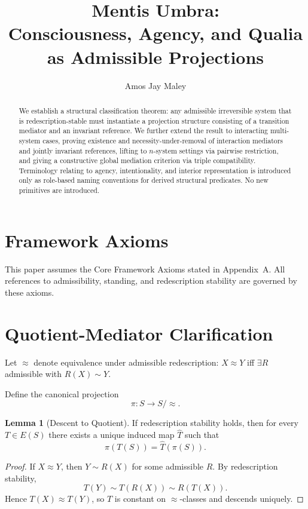 \documentclass[11pt]{article}
\title{Mentis Umbra:\\
Consciousness, Agency, and Qualia as Admissible Projections}
\author{Amos Jay Maley}
\date{}
\theoremstyle{definition}
\newtheorem{lemma}{Lemma}
\begin{document}
\maketitle

\begin{abstract}
We establish a structural classification theorem: any admissible irreversible system that is redescription-stable must instantiate a projection structure consisting of a transition mediator and an invariant reference. We further extend the result to interacting multi-system cases, proving existence and necessity-under-removal of interaction mediators and jointly invariant references, lifting to $n$-system settings via pairwise restriction, and giving a constructive global mediation criterion via triple compatibility. Terminology relating to agency, intentionality, and interior representation is introduced only as role-based naming conventions for derived structural predicates. No new primitives are introduced.
\end{abstract}

\section{Framework Axioms}
This paper assumes the Core Framework Axioms stated in Appendix~A.
All references to admissibility, standing, and redescription stability are governed by these axioms.


\section{Quotient-Mediator Clarification}

Let $\approx$ denote equivalence under admissible redescription: 
$X \approx Y$ iff $\exists R$ admissible with $R(X)\sim Y$.

Define the canonical projection
\[
\pi: S \to S/{\approx}.
\]

\begin{lemma}[Descent to Quotient]
If redescription stability holds, then for every $T \in E(S)$ there exists a unique induced map
$\widehat{T}$ such that
\[
\pi(T(S)) = \widehat{T}(\pi(S)).
\]
\end{lemma}

\begin{proof}
If $X \approx Y$, then $Y \sim R(X)$ for some admissible $R$.
By redescription stability,
\[
T(Y) \sim T(R(X)) \sim R(T(X)).
\]
Hence $T(X) \approx T(Y)$, so $T$ is constant on $\approx$-classes and descends uniquely.
\end{proof}
\end{document}
